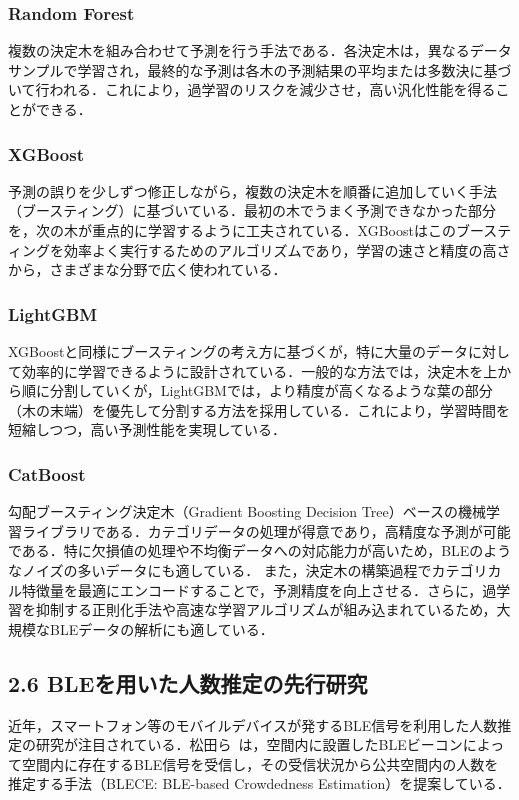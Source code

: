 \subsubsection*{Random Forest}
複数の決定木を組み合わせて予測を行う手法である\cite{randomforest}．各決定木は，異なるデータサンプルで学習され，最終的な予測は各木の予測結果の平均または多数決に基づいて行われる．これにより，過学習のリスクを減少させ，高い汎化性能を得ることができる．

\subsubsection*{XGBoost}
予測の誤りを少しずつ修正しながら，複数の決定木を順番に追加していく手法（ブースティング）に基づいている\cite{xgboost}．最初の木でうまく予測できなかった部分を，次の木が重点的に学習するように工夫されている．XGBoostはこのブースティングを効率よく実行するためのアルゴリズムであり，学習の速さと精度の高さから，さまざまな分野で広く使われている．

\subsubsection*{LightGBM}
XGBoostと同様にブースティングの考え方に基づくが，特に大量のデータに対して効率的に学習できるように設計されている\cite{lightgbm}．一般的な方法では，決定木を上から順に分割していくが，LightGBMでは，より精度が高くなるような葉の部分（木の末端）を優先して分割する方法を採用している．これにより，学習時間を短縮しつつ，高い予測性能を実現している．

\subsubsection*{CatBoost}
勾配ブースティング決定木（Gradient Boosting Decision Tree）ベースの機械学習ライブラリである\cite{catboost}．カテゴリデータの処理が得意であり，高精度な予測が可能である．特に欠損値の処理や不均衡データへの対応能力が高いため，BLEのようなノイズの多いデータにも適している．
また，決定木の構築過程でカテゴリカル特徴量を最適にエンコードすることで，予測精度を向上させる．さらに，過学習を抑制する正則化手法や高速な学習アルゴリズムが組み込まれているため，大規模なBLEデータの解析にも適している．

\subsection*{2.6 BLEを用いた人数推定の先行研究}
近年，スマートフォン等のモバイルデバイスが発するBLE信号を利用した人数推定の研究が注目されている．松田ら~\cite{senkou}は，空間内に設置したBLEビーコンによって空間内に存在するBLE信号を受信し，その受信状況から公共空間内の人数を推定する手法（BLECE: BLE-based Crowdedness Estimation）を提案している．

